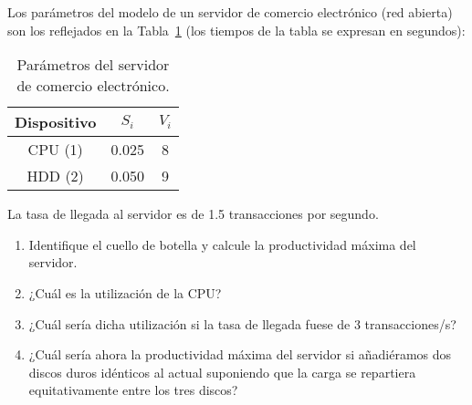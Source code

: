 \begin{ejercicio}\label{ej:5.29}
    Los parámetros del modelo de un servidor de comercio electrónico (red abierta) son los reflejados en la Tabla~\ref{tab:5.29} (los tiempos de la tabla se expresan en segundos):
    \begin{table}[h]
        \centering
        \begin{tabular}{|c|c|c|}
            \hline
            Dispositivo & $S_i$ & $V_i$ \\
            \hline
            CPU (1) & 0.025 & 8 \\
            HDD (2) & 0.050 & 9 \\
            \hline
        \end{tabular}
        \caption{Parámetros del servidor de comercio electrónico.}
        \label{tab:5.29}
    \end{table}
    La tasa de llegada al servidor es de 1.5 transacciones por segundo.
    \begin{enumerate}
        \item Identifique el cuello de botella y calcule la productividad máxima del servidor.
        \item ¿Cuál es la utilización de la CPU?
        \item ¿Cuál sería dicha utilización si la tasa de llegada fuese de 3 transacciones/s?
        \item ¿Cuál sería ahora la productividad máxima del servidor si añadiéramos dos discos duros idénticos al actual suponiendo que la carga se repartiera equitativamente entre los tres discos?
    \end{enumerate}
\end{ejercicio}
\begin{comment}
\solucion
    \begin{enumerate}
        \item El cuello de botella es el HDD ya que su demanda de servicio ($0.45$ s) es mayor que la de la CPU ($0.2$ s). La productividad máxima del servidor es $X_0^{\max} = 2.22$ transacciones/s.
        \item La utilización de la CPU es $U_{cpu} = 0.3$ (30\%).
        \item En ese caso el servidor estaría saturado. La utilización de la CPU jamás podría ser mayor que el 44\% en este servidor.
        \item Ahora, la productividad máxima del servidor sería $
        \item X_0^{\max} = 5$ transacciones/s (el cuello de botella pasaría a ser la CPU).
    \end{enumerate}
\end{comment}

